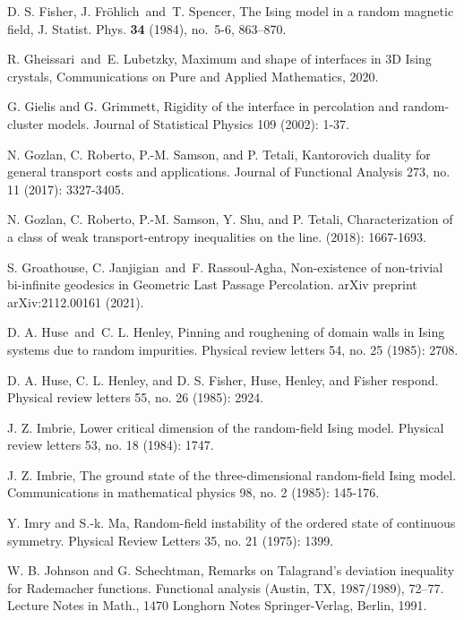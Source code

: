 \documentclass[11pt, reqno]{amsart}
\numberwithin{equation}{section}
\begin{document}
\begin{thebibliography}{}
D. S. Fisher, J. Fr\"{o}hlich\ and\ T. Spencer, The Ising model in a random magnetic field, J. Statist. Phys. {\bf 34} (1984), no.~5-6, 863--870. 

R. Gheissari\ and\ E. Lubetzky, Maximum and shape of interfaces in 3D Ising crystals, Communications on Pure and Applied Mathematics, 2020.

G. Gielis and G. Grimmett, Rigidity of the interface in percolation and random-cluster models. Journal of Statistical Physics 109 (2002): 1-37.

N. Gozlan, C. Roberto, P.-M. Samson, and P. Tetali, Kantorovich duality for general transport costs and applications. Journal of Functional Analysis 273, no. 11 (2017): 3327-3405.

N. Gozlan, C. Roberto, P.-M. Samson, Y. Shu, and P. Tetali, Characterization of a class of weak transport-entropy inequalities on the line. (2018): 1667-1693.

S. Groathouse, C. Janjigian\ and\ F. Rassoul-Agha, Non-existence of non-trivial bi-infinite geodesics in Geometric Last Passage Percolation. arXiv preprint arXiv:2112.00161 (2021).

D. A. Huse\ and\ C. L. Henley, Pinning and roughening of domain walls in Ising systems due to random impurities. Physical review letters 54, no. 25 (1985): 2708.

D. A. Huse, C. L. Henley, and D. S. Fisher, Huse, Henley, and Fisher respond. Physical review letters 55, no. 26 (1985): 2924.

J. Z. Imbrie, Lower critical dimension of the random-field Ising model. Physical review letters 53, no. 18 (1984): 1747.

J. Z. Imbrie, The ground state of the three-dimensional random-field Ising model. Communications in mathematical physics 98, no. 2 (1985): 145-176.

Y. Imry and S.-k. Ma, Random-field instability of the ordered state of continuous symmetry. Physical Review Letters 35, no. 21 (1975): 1399.

W. B. Johnson and G. Schechtman,
Remarks on Talagrand's deviation inequality for Rademacher functions. Functional analysis (Austin, TX, 1987/1989), 72–77.
Lecture Notes in Math., 1470
Longhorn Notes
Springer-Verlag, Berlin, 1991.


\end{thebibliography}
\end{document}
